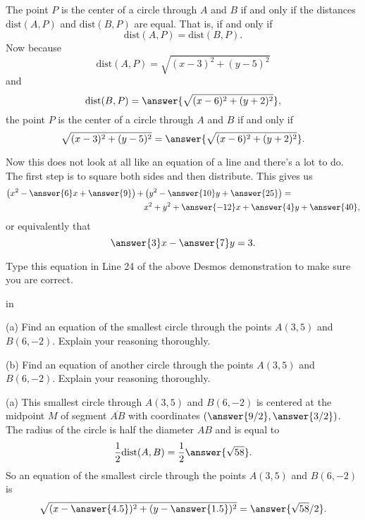 \documentclass{ximera}
\newcommand{\pskip}{\vskip 0.1 in}
\begin{document}
\begin{example}
\begin{explanation}
\begin{question}   \label{Q0009e9ee}
The point $P$ is the center of a circle through $A$ and $B$ if and only if the distances $\text{dist}(A,P)$ and $\text{dist}(B,P)$ are equal. That is, if and only if
\[
   \text{dist}(A,P)  = \text{dist}(B,P) .
\]
Now because
\[
   \text{dist}(A,P) = \sqrt{(x-3)^2 + (y-5)^2}
\] 
and
\[
  \text{dist}(B,P) = \answer{\sqrt{(x-6)^2 + (y+2)^2}} ,
\]
the point $P$ is the center of a circle through $A$ and $B$ if and only if
\[
   \sqrt{(x-3)^2 + (y-5)^2} = \answer{\sqrt{(x-6)^2 + (y+2)^2}} .
\]

Now this does not look at all like an equation of a line and there's a lot to do. The first step is to square both sides and then distribute. This gives us
\begin{align*}
      \left( x^2 - \answer{6}x +\answer{9}  \right) + & \left( y^2 - \answer{10}y +\answer{25} \right)  = \\
                                                                          & x^2 + y^2 +\answer{-12}x + \answer{4}y + \answer{40} ,
\end{align*} 
or equivalently that
\[
    \answer{3}x - \answer{7}y = 3 .
\]
 
Type this equation in Line 24 of the above Desmos demonstration to make sure you are correct.

\end{question}

\end{explanation}

\pskip

\begin{question} \label{Q1sdfdsfdsf4433}
(a) Find an equation of the smallest circle through the points $A(3,5)$ and $B(6,-2)$. Explain your reasoning thoroughly.

(b) Find an equation of another circle through the points $A(3,5)$ and $B(6,-2)$. Explain your reasoning thoroughly.

\begin{explanation}
(a) This smallest circle through $A(3,5)$ and $B(6,-2)$ is centered at the midpoint $M$ of segment $\overline{AB}$ with coordinates $(\answer{9/2}, \answer{3/2})$. The radius of the circle is half the diameter $AB$ and is equal to
\[
        \frac{1}{2} \text{dist}(A,B) = \frac{1}{2} \answer{\sqrt{58}} .
\]
So an equation of the smallest circle through the points $A(3,5)$ and $B(6,-2)$ is
\[
    \sqrt{(x-\answer{4.5})^2 + (y-\answer{1.5})^2} = \answer{\sqrt{58}/2} . 
\]


\end{explanation}
\end{question}
\end{example}
\end{document}
